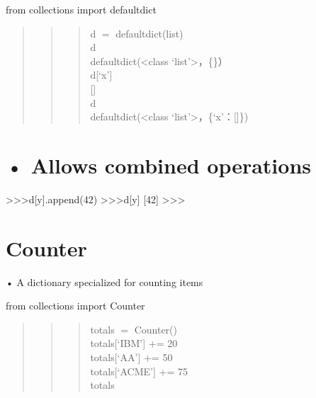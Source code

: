 \documentclass[
  letterpaper,
  DIV=11,
  numbers=noendperiod]{scrreprt}
\newenvironment{Shaded}{\begin{snugshade}}{\end{snugshade}}
\newcommand{\NormalTok}[1]{\textcolor[rgb]{0.00,0.23,0.31}{#1}}
\begin{document}
from collections import defaultdict

\begin{quote}
\begin{quote}
\begin{quote}
d \(=\) defaultdict(list)\\
d\\
defaultdict(\textless class `list'\textgreater，\{\}）\\
d{[}`x'{]}\\
{[}{]}\\
d\\
defaultdict(\textless class `list'\textgreater，\{`x'：{[}{]}\})
\end{quote}
\end{quote}
\end{quote}


\chapter{• Allows combined operations}\label{allows-combined-operations}

\begin{Shaded}
\begin{Highlighting}[]
\NormalTok{\textgreater{}\textgreater{}\textgreater{}d[\textquotesingle{}y\textquotesingle{}].append(42)   }
\NormalTok{\textgreater{}\textgreater{}\textgreater{}d[\textquotesingle{}y\textquotesingle{}]   }
\NormalTok{[42]   }
\NormalTok{\textgreater{}\textgreater{}\textgreater{} }
\end{Highlighting}
\end{Shaded}


\chapter{Counter}\label{counter}

• A dictionary specialized for counting items

from collections import Counter

\begin{quote}
\begin{quote}
\begin{quote}
totals \(=\) Counter()\\
totals{[}`IBM'{]} += 20\\
totals{[}`AA'{]} += 50\\
totals{[}`ACME'{]} += 75\\
totals
\end{quote}
\end{quote}
\end{quote}
\end{document}
